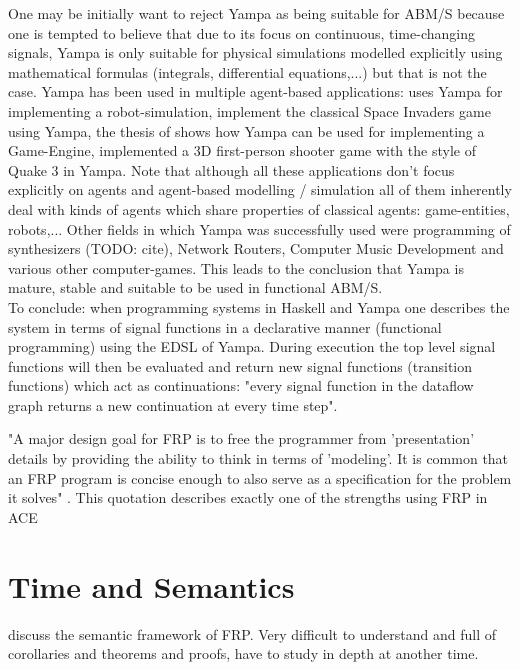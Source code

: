 \documentclass{article}
\begin{document}
One may be initially want to reject Yampa as being suitable for ABM/S because one is tempted to believe that due to its focus on continuous, time-changing signals, Yampa is only suitable for physical simulations modelled explicitly using mathematical formulas (integrals, differential equations,...) but that is not the case. Yampa has been used in multiple agent-based applications: \cite{Hudak2003} uses Yampa for implementing a robot-simulation, \cite{Courtney2003} implement the classical Space Invaders game using Yampa, the thesis of \cite{Meisinger2010} shows how Yampa can be used for implementing a Game-Engine, \cite{Frag2005} implemented a 3D first-person shooter game with the style of Quake 3 in Yampa. Note that although all these applications don't focus explicitly on agents and agent-based modelling / simulation all of them inherently deal with kinds of agents which share properties of classical agents: game-entities, robots,... Other fields in which Yampa was successfully used were programming of synthesizers (TODO: cite), Network Routers, Computer Music Development and various other computer-games. This leads to the conclusion that Yampa is mature, stable and suitable to be used in functional ABM/S. \\

To conclude: when programming systems in Haskell and Yampa one describes the system in terms of signal functions in a declarative manner (functional programming) using the EDSL of Yampa. During execution the top level signal functions will then be evaluated and return new signal functions (transition functions) which act as continuations: "every signal function in the dataflow graph returns a new continuation at every time step".

"A major design goal for FRP is to free the programmer from 'presentation' details by providing the ability to think in terms of 'modeling'. It is common that an FRP program is concise enough to also serve as a specification for the problem it solves" \cite{Wan2000}. This quotation describes exactly one of the strengths using FRP in ACE \\



\section{Time and Semantics}
\cite{Wan2000} discuss the semantic framework of FRP. Very difficult to understand and full of corollaries and theorems and proofs, have to study in depth at another time.
\end{document}
